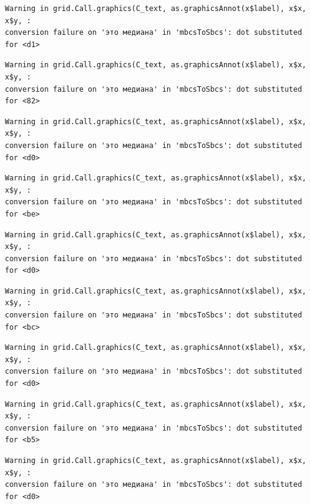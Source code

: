 \documentclass[
  letterpaper,
  DIV=11,
  numbers=noendperiod]{scrreprt}
\theoremstyle{definition}
\theoremstyle{remark}
\begin{document}
\begin{verbatim}
Warning in grid.Call.graphics(C_text, as.graphicsAnnot(x$label), x$x, x$y, :
conversion failure on 'это медиана' in 'mbcsToSbcs': dot substituted for <d1>
\end{verbatim}

\begin{verbatim}
Warning in grid.Call.graphics(C_text, as.graphicsAnnot(x$label), x$x, x$y, :
conversion failure on 'это медиана' in 'mbcsToSbcs': dot substituted for <82>
\end{verbatim}

\begin{verbatim}
Warning in grid.Call.graphics(C_text, as.graphicsAnnot(x$label), x$x, x$y, :
conversion failure on 'это медиана' in 'mbcsToSbcs': dot substituted for <d0>
\end{verbatim}

\begin{verbatim}
Warning in grid.Call.graphics(C_text, as.graphicsAnnot(x$label), x$x, x$y, :
conversion failure on 'это медиана' in 'mbcsToSbcs': dot substituted for <be>
\end{verbatim}

\begin{verbatim}
Warning in grid.Call.graphics(C_text, as.graphicsAnnot(x$label), x$x, x$y, :
conversion failure on 'это медиана' in 'mbcsToSbcs': dot substituted for <d0>
\end{verbatim}

\begin{verbatim}
Warning in grid.Call.graphics(C_text, as.graphicsAnnot(x$label), x$x, x$y, :
conversion failure on 'это медиана' in 'mbcsToSbcs': dot substituted for <bc>
\end{verbatim}

\begin{verbatim}
Warning in grid.Call.graphics(C_text, as.graphicsAnnot(x$label), x$x, x$y, :
conversion failure on 'это медиана' in 'mbcsToSbcs': dot substituted for <d0>
\end{verbatim}

\begin{verbatim}
Warning in grid.Call.graphics(C_text, as.graphicsAnnot(x$label), x$x, x$y, :
conversion failure on 'это медиана' in 'mbcsToSbcs': dot substituted for <b5>
\end{verbatim}

\begin{verbatim}
Warning in grid.Call.graphics(C_text, as.graphicsAnnot(x$label), x$x, x$y, :
conversion failure on 'это медиана' in 'mbcsToSbcs': dot substituted for <d0>
\end{verbatim}
\end{document}
